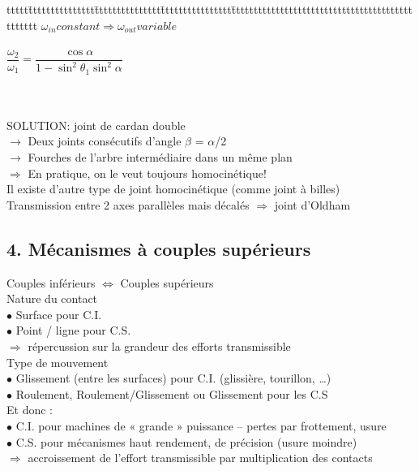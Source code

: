 \begin{bluebox}
\begin{tabbing}
ttttt\=ttttttttttttttt\=ttttttttttttttt\=tttttttttttttttt\=tttttttttttttttttttttttttttttttttttttttttttttttt\kill
\>$\omega_{in} constant$\>\>$\Rightarrow$\>$\omega_{out}variable$\\\\
\>\>$\dfrac{\omega_2}{\omega_1}=\dfrac{\cos\alpha}{1-\sin^2\theta_1\sin^2\alpha}$
\end{tabbing}
\end{bluebox}\\\\

{\color{blue}SOLUTION}: joint de cardan {\color{orange}double}\\
$\rightarrow$ Deux joints consécutifs d’angle $\beta$ = $\alpha$/2\\
$\rightarrow$ Fourches de l’arbre intermédiaire dans un même plan\\

$\Rightarrow$ En pratique, on le veut toujours homocinétique!\\
Il existe d'autre type de joint homocinétique (comme joint à billes)\\
Transmission entre 2 axes parallèles mais décalés $\Rightarrow$ joint d'Oldham\\

\subsection*{4. Mécanismes à couples supérieurs}
{\color{orange}Couples inférieurs $\Leftrightarrow$ Couples supérieurs}\\

{\color{orange}Nature du contact}\\
$\bullet$ Surface pour C.I. \\
$\bullet$ Point / ligne pour C.S.\\ 
$\Rightarrow$ répercussion sur la grandeur des efforts transmissible\\
{\color{orange}Type de mouvement}\\
$\bullet$ Glissement (entre les surfaces) pour C.I. (glissière, tourillon, …) \\
$\bullet$ Roulement, Roulement/Glissement ou Glissement pour les C.S \\
{\color{orange}Et donc} :\\
$\bullet$ C.I. pour machines de « grande » puissance – pertes par frottement, usure \\
$\bullet$ C.S. pour mécanismes haut rendement, de précision (usure moindre)\\
$\Rightarrow$ accroissement de l’effort transmissible par multiplication des contacts\\

